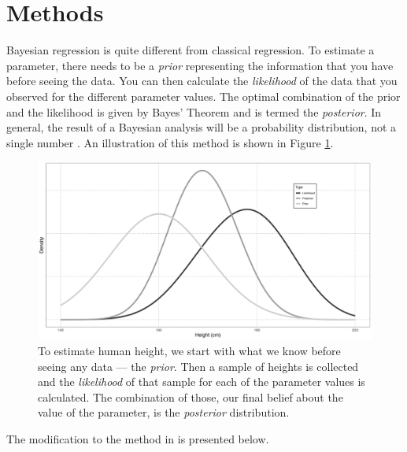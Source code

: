 \documentclass[letterpaper]{article}
\begin{document}
\section{Methods}
Bayesian regression is quite different from classical regression. To estimate a parameter, there needs to be a \emph{prior} representing the information that you have before seeing the data. You can then calculate the \emph{likelihood} of the data that you observed for the different parameter values. The optimal combination of the prior and the likelihood is given by Bayes' Theorem and is termed the \emph{posterior}. In general, the result of a Bayesian analysis will be a probability distribution, not a single number \parencite{mcelreathStatisticalRethinkingBayesian2020}. An illustration of this method is shown in Figure \ref{fig:bayesianExplanation}.

\begin{figure}[H]
	\centering
	\includegraphics[width = \textwidth]{images/bayesianExample.png}
	\caption{To estimate human height, we start with what we know before seeing any data --- the \emph{prior}. Then a sample of heights is collected and the \emph{likelihood} of that sample for each of the parameter values is calculated. The combination of those, our final belief about the value of the parameter, is the \emph{posterior} distribution.}
	\label{fig:bayesianExplanation}
\end{figure}

The modification to the method in \cite{saittaEffectSizeStatistical2020} is presented below.
\end{document}
